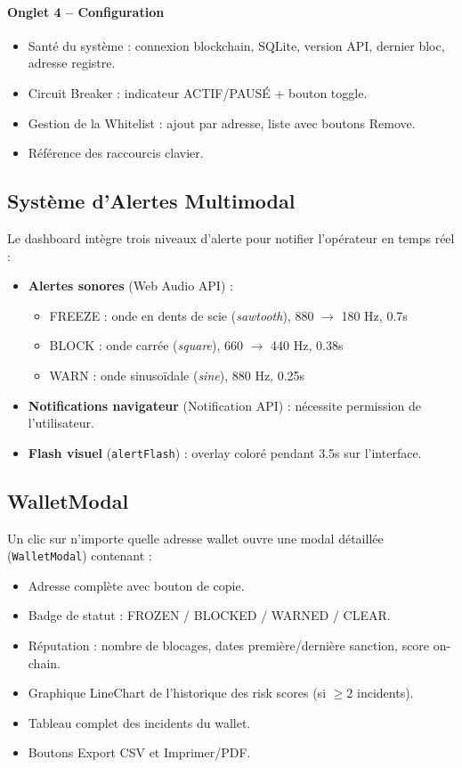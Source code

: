 \documentclass[12pt,a4paper]{report}
\newcommand{\code}[1]{\texttt{#1}}
\begin{document}
\paragraph{Onglet 4 -- Configuration}
\begin{itemize}
  \item Santé du système : connexion blockchain, SQLite, version API, dernier bloc, adresse registre.
  \item Circuit Breaker : indicateur ACTIF/PAUSÉ + bouton toggle.
  \item Gestion de la Whitelist : ajout par adresse, liste avec boutons Remove.
  \item Référence des raccourcis clavier.
\end{itemize}

\subsection{Système d'Alertes Multimodal}

Le dashboard intègre trois niveaux d'alerte pour notifier l'opérateur en temps réel :

\begin{itemize}
  \item \textbf{Alertes sonores} (Web Audio API) :
    \begin{itemize}
      \item FREEZE : onde en dents de scie (\textit{sawtooth}), 880 $\to$ 180 Hz, 0.7s
      \item BLOCK : onde carrée (\textit{square}), 660 $\to$ 440 Hz, 0.38s
      \item WARN : onde sinusoïdale (\textit{sine}), 880 Hz, 0.25s
    \end{itemize}
  \item \textbf{Notifications navigateur} (Notification API) : nécessite permission de l'utilisateur.
  \item \textbf{Flash visuel} (\code{alertFlash}) : overlay coloré pendant 3.5s sur l'interface.
\end{itemize}

\subsection{WalletModal}

Un clic sur n'importe quelle adresse wallet ouvre une modal détaillée (\code{WalletModal}) contenant :
\begin{itemize}
  \item Adresse complète avec bouton de copie.
  \item Badge de statut : FROZEN / BLOCKED / WARNED / CLEAR.
  \item Réputation : nombre de blocages, dates première/dernière sanction, score on-chain.
  \item Graphique LineChart de l'historique des risk scores (si $\geq 2$ incidents).
  \item Tableau complet des incidents du wallet.
  \item Boutons Export CSV et Imprimer/PDF.
\end{itemize}
\end{document}
